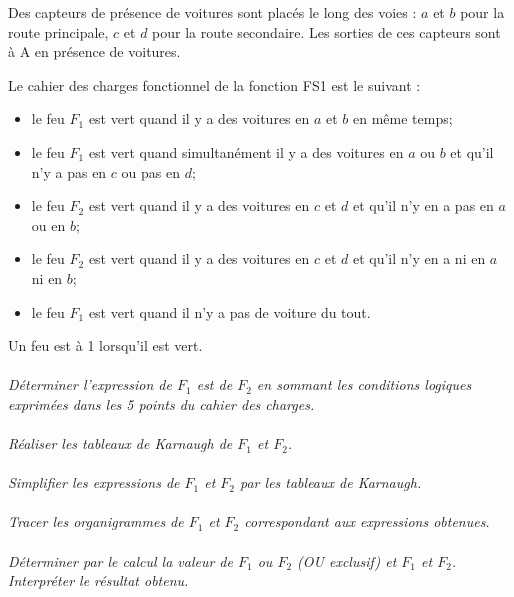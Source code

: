 \documentclass[11pt,oneside]{article}
\begin{document}
Des capteurs de présence de voitures sont placés le long des voies : $a$ et $b$ pour la route principale, $c$ et $d$ pour la route secondaire. Les sorties de ces capteurs sont à A en présence de voitures. 

Le cahier des charges fonctionnel de la fonction FS1 est le suivant : 
\begin{itemize}
\item le feu $F_1$ est vert quand il y a des voitures en $a$ et $b$ en même temps;
\item le feu $F_1$ est vert quand simultanément il y a des voitures en $a$ ou $b$ et qu'il n'y a pas en $c$ ou pas en $d$;
\item le feu $F_2$ est vert quand il y a des voitures en $c$ et $d$ et qu'il n'y en a pas en $a$ ou en $b$;
\item le feu $F_2$ est vert quand il y a des voitures en $c$ et $d$ et qu'il n'y en a ni en $a$ ni en $b$;
\item le feu $F_1$ est vert quand il n'y a pas de voiture du tout.
\end{itemize}

Un feu est à 1 lorsqu'il est vert.

\paragraph{}
\textit{Déterminer l'expression de $F_1$ est de $F_2$ en sommant les conditions logiques exprimées dans les 5 points du cahier des charges.}

\paragraph{}
\textit{Réaliser les tableaux de Karnaugh de $F_1$ et $F_2$.}

\paragraph{}
\textit{Simplifier les expressions de $F_1$ et $F_2$ par les tableaux de Karnaugh.}

\paragraph{}
\textit{Tracer les organigrammes de $F_1$ et $F_2$ correspondant aux expressions obtenues. }

\paragraph{}
\textit{Déterminer par le calcul la valeur de $F_1$ ou $F_2$ (OU exclusif) et $F_1$ et $F_2$. Interpréter le résultat obtenu.}
\end{document}
